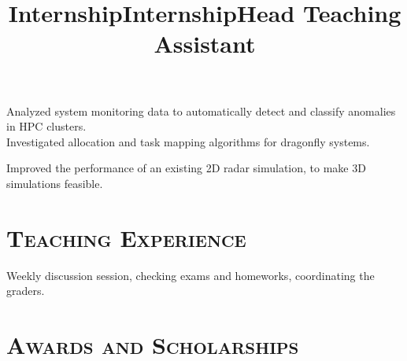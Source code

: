 \begin{resume}
	\title{Internship}
	\begin{position}
		Analyzed system monitoring data to automatically detect and classify
    anomalies in HPC clusters. \\
    Investigated allocation and task mapping algorithms for dragonfly systems.
	\end{position}
	
	\title{Internship}
	\begin{position}
		Improved the performance of an existing 2D radar simulation, to make 3D
    simulations feasible.
	\end{position}
	
	
	\section{\textsc{Teaching Experience}}
	
	\title{Head Teaching Assistant}
	\begin{position}
		Weekly discussion session, checking exams and homeworks, coordinating the
    graders.  
	\end{position}
  
	
	\section{\textsc{Awards and Scholarships}}
	

\end{resume}

